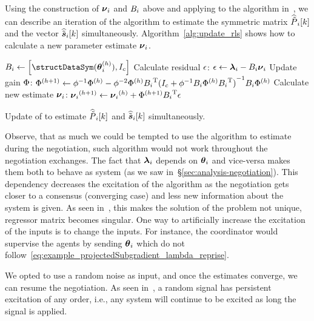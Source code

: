 \documentclass[../main.tex]{subfiles}
\begin{document}
Using the construction of ${\boldsymbol{\nu}_{i}}$ and ${B_i}$ above and applying to the \RLS{} algorithm in~\cite{AstroemWittenmark1989}, we can describe an iteration of the \RLS{} algorithm to estimate the symmetric matrix $\widehat{\tilde{P}}_{i}[k]$ and the vector $\widehat{\tilde{\boldsymbol{s}}}_{i}[k]$ simultaneously.
Algorithm~\ref{alg:update_rls} shows how to calculate a new parameter estimate ${\boldsymbol{\nu}_{i}}$.

\begin{algorithm2e}[h]
  \DontPrintSemicolon%
  $\rlssysinput\gets\left[\text{\structDataSym}(\thetai\h),I_{c}\right]$\;
  Calculate residual ${\epsilon}$: ${\epsilon}\gets {\boldsymbol{\lambda}_{i}}-{B_i}{\boldsymbol{\nu}_{i}}$\;
  Update gain ${\Phi}$: ${\Phi}^{(h+1)}\gets {\phi}^{-1}{\Phi}^{(h)}-{\phi}^{-2}{\Phi}^{(h)}{B_i}^{\mathrm{T}}{(I_{c}+{\phi}^{-1}{B_i}{\Phi}^{(h)}{B_i}^{\mathrm{T}})}^{-1}{B_i}{\Phi}^{(h)}$\;
  Calculate new estimate ${\boldsymbol{\nu}_{i}}$: ${\boldsymbol{\nu}_{i}}^{(h+1)}\gets{\boldsymbol{\nu}_{i}}^{(h)}+{\Phi}^{(h+1)}{B_i}^{\mathrm{T}}{\epsilon}$\;
  \caption{Update of \RLS{} to estimate $\widehat{\tilde{P}}_{i}[k]$ and $\widehat{\tilde{\boldsymbol{s}}}_{i}[k]$ simultaneously.}\label{alg:update_rls}
\end{algorithm2e}

Observe, that as much we could be tempted to use the algorithm to estimate during the negotiation, such algorithm would not work throughout the negotiation exchanges.
The fact that $\boldsymbol{\lambda}_{i}$ depends on $\boldsymbol{\theta}_{i}$ and vice-versa makes them both to behave as \dt{} system (as we saw in~\S\ref{sec:analysis-negotiation}).
This dependency decreases the excitation of the algorithm as the negotiation gets closer to a consensus (converging case) and less new information about the system is given.
As seen in~\cite{AstroemWittenmark1989}, this makes the solution of the \LS{} problem not unique, regressor matrix becomes singular.
One way to artificially increase the excitation of the inputs is to change the inputs.
For instance, the coordinator would supervise the agents by sending $\boldsymbol{\theta}_{i}$ which do not follow~\eqref{eq:example_projectedSubgradient_lambda_reprise}.

We opted to use a random noise as input, and once the estimates converge, we can resume the negotiation.
As seen in~\cite[\S3.4]{AstroemWittenmark1989}, a random signal has persistent excitation of any order, i.e., any system will continue to be excited as long the signal is applied.
\end{document}
